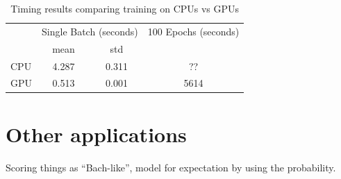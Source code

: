 


\begin{table}[tb]
  \centering
  \caption{Timing results comparing training on CPUs vs GPUs}
  \label{tab:label}
  \begin{tabular}{l c c c}
    \toprule
    \multirow{2}{*}{} & \multicolumn{2}{c}{Single Batch (seconds)} & 100 Epochs (seconds) \\
    \cmidrule{2-4}
    & mean & std & \\
    \midrule
    CPU & 4.287 & 0.311 & ??  \\
    GPU & 0.513 & 0.001 & 5614 \\
    \bottomrule
  \end{tabular}
\end{table}

\section{Other applications}

Scoring things as ``Bach-like'', model for expectation by using the probability.
